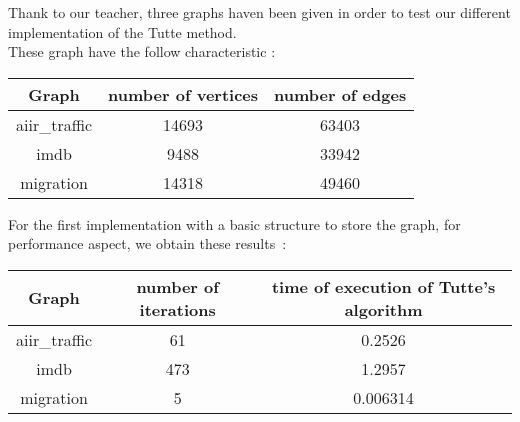 
Thank to our teacher, three graphs haven been given in order to test our
different implementation of the Tutte method.\\

These graph have the follow characteristic :

\begin{center}
\begin{tabular}{|c|c|c|}
\hline
Graph & number of vertices & number of edges \\
\hline
aiir\_traffic & 14693 & 63403\\
imdb & 9488 & 33942\\
migration & 14318 & 49460\\
\hline
\end{tabular}
\end{center}


For the first implementation with a basic structure to
store the graph, for performance aspect, we obtain these results~:

\begin{center}
\begin{tabular}{|c|c|c|}
\hline
Graph & number of iterations & time of execution of Tutte's algorithm \\
\hline
aiir\_traffic & 61 & 0.2526\\
imdb & 473 & 1.2957\\
migration & 5 & 0.006314\\
\hline
\end{tabular}
\end{center}



